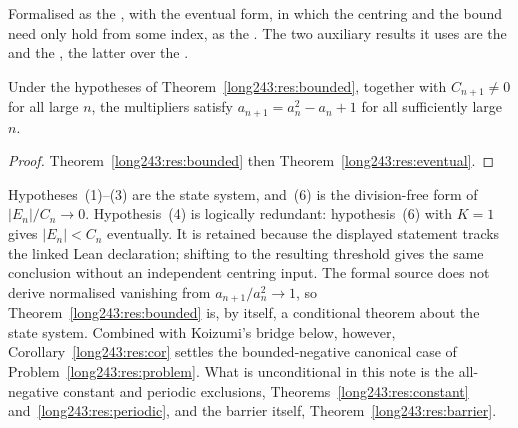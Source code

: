 \noindent Formalised as the
, with the eventual form, in which the centring and the bound need
only hold from some index, as the
.  The two auxiliary results it uses are the
 and the
, the latter over the
.

\begin{corollary}\label{long243:res:cor}
Under the hypotheses of Theorem~\ref{long243:res:bounded}, together with
$C_{n+1}\ne0$ for all large $n$, the multipliers satisfy
$a_{n+1}=a_n^{2}-a_n+1$ for all sufficiently large $n$.
\end{corollary}

\begin{proof}
Theorem~\ref{long243:res:bounded} then Theorem~\ref{long243:res:eventual}.
\end{proof}

Hypotheses~(1)--(3) are the state system, and~(6) is the division-free form of
$|E_n|/C_n\to0$.  Hypothesis~(4) is logically redundant: hypothesis~(6) with
$K=1$ gives $|E_n|<C_n$ eventually.  It is retained because the displayed
statement tracks the linked Lean declaration; shifting to the resulting
threshold gives the same conclusion without an independent centring input.
The formal source does not derive normalised vanishing from
$a_{n+1}/a_n^{2}\to1$, so Theorem~\ref{long243:res:bounded} is, by itself, a
conditional theorem about the state system.  Combined with
Koizumi's bridge below, however, Corollary~\ref{long243:res:cor} settles the
bounded-negative canonical case of Problem~\ref{long243:res:problem}.  What is
unconditional in this note is the all-negative constant and periodic
exclusions, Theorems~\ref{long243:res:constant} and~\ref{long243:res:periodic}, and the barrier
itself, Theorem~\ref{long243:res:barrier}.

